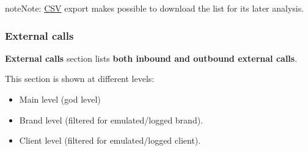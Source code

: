 \documentclass[letterpaper,10pt,english]{sphinxmanual}
\begin{document}
\begin{notice}{note}{Note:}
\href{https://es.wikipedia.org/wiki/CSV}{CSV} export makes possible to
download the list for its later analysis.
\end{notice}


\subsubsection{External calls}
\label{administration_portal/client/residential/calls/external_calls:id1}\label{administration_portal/client/residential/calls/external_calls::doc}\label{administration_portal/client/residential/calls/external_calls:external-calls}
\textbf{External calls} section lists \textbf{both inbound and outbound external calls}.

This section is shown at different levels:
\begin{itemize}
\item {} 
Main level (god level)

\item {} 
Brand level (filtered for emulated/logged brand).

\item {} 
Client level (filtered for emulated/logged client).

\end{itemize}
\end{document}
